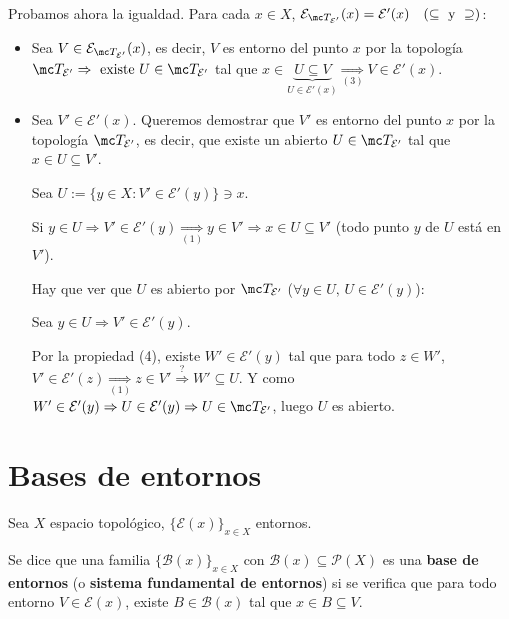 \begin{dem}
    Probamos ahora la igualdad. Para cada \(x \in X\), \(\mathcal{E}_{\mc T_{\mathcal{E}'}}(x) = \mathcal{E}'(x) \quad (\subseteq \text{ y } \supseteq)\):
    \begin{itemize}
        \item[\(\underline{\subseteq)}\)] Sea \(V \in \mathcal{E}_{\mc T_{\mathcal{E}'}}(x)\), es decir, \(V\) es entorno del punto \(x\) por la topología \(\mc T_{\mathcal{E}'} \Rightarrow \text{ existe } U \in \mc T_{\mathcal{E}'}\) tal que \(x \in \underbrace{U \subseteq V}_{U \in \mathcal{E}'(x)} \underset{(3)}{\Rightarrow} V \in \mathcal{E}'(x)\).
        
        \item[\(\underline{\supseteq)}\)] Sea \(V' \in \mathcal{E}'(x)\). Queremos demostrar que \(V'\) es entorno del punto \(x\) por la topología \(\mc T_{\mathcal{E}'}\), es decir, que existe un abierto \(U \in \mc T_{\mathcal{E}'}\) tal que \(x \in U \subseteq V'\).
        
        Sea \(U := \{ y \in X : V' \in \mathcal{E}'(y) \} \ni x\).
        
        Si \(y \in U \Rightarrow V' \in \mathcal{E}'(y) \underset{(1)}{\Rightarrow} y \in V' \Rightarrow x \in U \subseteq V'\) (todo punto \(y\) de \(U\) está en \(V'\)).
        
        Hay que ver que \(U\) es abierto por \(\mc T_{\mathcal{E}'}\) (\(\forall y \in U, \, U \in \mathcal{E}'(y)\)):
        
        Sea \(y \in U \Rightarrow V' \in \mathcal{E}'(y)\).
        
        Por la propiedad (4), existe \(W' \in \mathcal{E}'(y)\) tal que para todo \(z \in W'\), \(V' \in \mathcal{E}'(z) \underset{(1)}{\Rightarrow} z \in V' \stackrel{?}{\Rightarrow} W' \subseteq U\). Y como \(W' \in \mathcal{E}'(y) \Rightarrow U \in \mathcal{E}'(y) \Rightarrow U \in \mc T_{\mathcal{E}'}\), luego \(U\) es abierto.
    \end{itemize}
\end{dem}

\section{Bases de entornos}

Sea \(X\) espacio topológico, \(\{\mathcal{E}(x)\}_{x \in X}\) entornos.

\begin{defi}
    Se dice que una familia \(\{\mathcal{B}(x)\}_{x \in X}\) con \(\mathcal{B}(x) \subseteq \mathcal{P}(X)\) es una \textbf{base de entornos} (o \textbf{sistema fundamental de entornos}) si se verifica que para todo entorno \(V \in \mathcal{E}(x)\), existe \(B \in \mathcal{B}(x)\) tal que \(x \in B \subseteq V\).
\end{defi}

